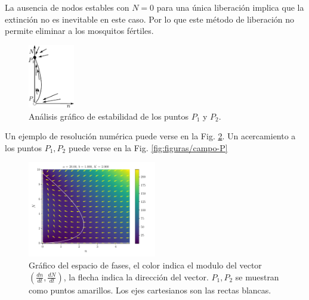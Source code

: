 \documentclass[twocolumn,aps,prl]{revtex4-1}
\begin{document}
La ausencia de nodos estables con $N=0$ para una única liberación implica que la extinción no es inevitable en este caso. Por lo que este método de liberación no permite eliminar a los mosquitos fértiles. 



\begin{figure}[!ht]
    \centering  
    \includegraphics[width=0.18\textwidth]{figuras/cosa.pdf}
    \caption{Análisis gráfico de estabilidad de los puntos $P_1$ y $P_2$.}
    \label{fig:cosa}
\end{figure}

Un ejemplo de resolución numérica puede verse en la Fig. \ref{fig:figuras/campo}. Un acercamiento a los puntos $P_1, P_2$ puede verse en la Fig. \ref{fig:figuras/campo-P}

\begin{figure}[ht!]
    \centering
        \includegraphics[width = 0.5\textwidth]{figuras/campo.pdf}
        \caption{Gráfico del espacio de fases, el color indica el modulo del vector $(\frac{dn}{dt}, \frac{dN}{dt})$, la flecha indica la dirección del vector. $P_1, P_2$ se muestran como puntos amarillos. Los ejes cartesianos son las rectas blancas.}
        \label{fig:figuras/campo}
\end{figure}
\end{document}
